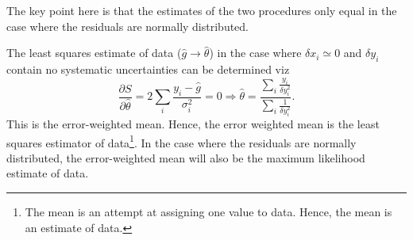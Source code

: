 The key point here is that the estimates of the two procedures only equal in the case where the residuals are normally distributed.
\begin{example}
	The least squares estimate of data ($\hat{g}\rightarrow \hat{\theta}$) in the case where $\delta x_i\simeq 0$ and $\delta y_i$ contain no systematic uncertainties can be determined viz
	\begin{equation}
		\frac{\partial S}{\partial \hat{\theta}}=2\sum_i\frac{y_i-\hat{g}}{\sigma_i^2}=0\Rightarrow \hat{\theta	}=\frac{\sum_i\frac{y_i}{\delta y_i^2}}{\sum_i\frac{1}{\delta y_i^2}}.
	\end{equation}
	This is the error-weighted mean. Hence, the error weighted mean is the least squares estimator of data\footnote{The mean is an attempt at assigning one value to data. Hence, the mean is an estimate of data.}. In the case where the residuals are normally distributed, the error-weighted mean will also be the maximum likelihood estimate of data.
\end{example}